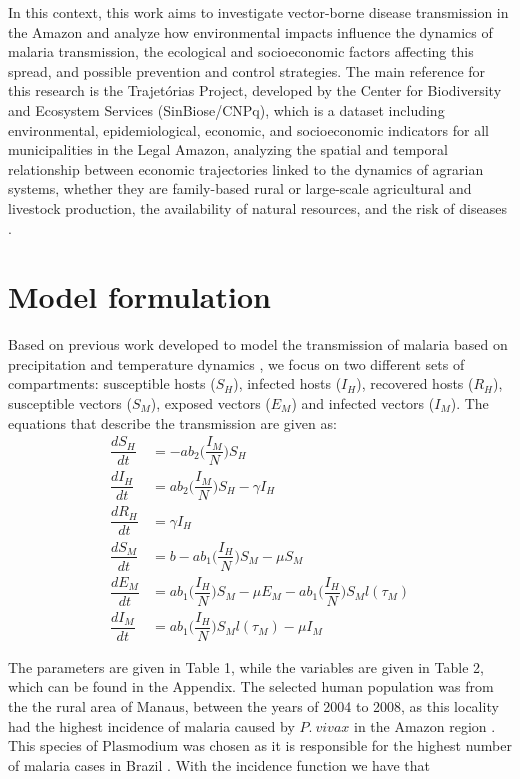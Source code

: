 \documentclass[3p,times]{elsarticle}
\begin{document}
In this context, this work aims to investigate vector-borne disease 
transmission in the Amazon and analyze how environmental impacts 
influence the dynamics of malaria transmission, the ecological and 
socioeconomic factors affecting this spread, and possible prevention 
and control strategies. The main reference for this research is the 
Trajetórias Project, developed by the Center for Biodiversity and 
Ecosystem Services (SinBiose/CNPq), which is a dataset including 
environmental, epidemiological, economic, and socioeconomic indicators 
for all municipalities in the Legal Amazon, analyzing the spatial and 
temporal relationship between economic trajectories linked to the dynamics 
of agrarian systems, whether they are family-based rural or large-scale 
agricultural and livestock production, the availability of natural resources, 
and the risk of diseases \cite{Rorato2023}.

\section{Model formulation}
\label{}
Based on previous work developed to model the transmission of malaria based on precipitation and temperature dynamics \cite{Parham2010}, we focus on two different sets of compartments: susceptible hosts ($S_H$), infected hosts ($I_H$), recovered hosts ($R_H$), susceptible vectors ($S_M$), exposed vectors ($E_M$) and infected vectors ($I_M$). The equations that describe the transmission are given as:
\begin{align}
\dfrac{dS_H}{dt} & = -ab_2\bigg(\dfrac{I_M}{N}\bigg)S_H \label{eq1}\\
\dfrac{dI_H}{dt} & = ab_2\bigg(\dfrac{I_M}{N}\bigg)S_H - \gamma I_H \label{eq2}\\
\dfrac{dR_H}{dt} & = \gamma I_H \label{eq3}\\
\dfrac{dS_M}{dt} & = b - ab_1\bigg(\dfrac{I_H}{N}\bigg)S_M - \mu S_M \label{eq4}\\
\dfrac{dE_M}{dt} & = ab_1\bigg(\dfrac{I_H}{N}\bigg)S_M - \mu E_M - ab_1\bigg(\dfrac{I_H}{N}\bigg)S_Ml(\tau_M) \label{eq5}\\
\dfrac{dI_M}{dt} & = ab_1\bigg(\dfrac{I_H}{N}\bigg)S_Ml(\tau_M) - \mu I_M \label{eq6}
\end{align}

The parameters are given in Table 1, while the variables are given in Table 2, which can be found in the Appendix. The selected human population was from the the rural area of Manaus, between the years of 2004 to 2008, as this locality had the highest incidence of malaria caused by $P. \ vivax$ in the Amazon region \cite{Rorato2023}. This species of $\text{Plasmodium}$ was chosen as it is responsible for the highest number of malaria cases in Brazil \cite{OliveiraFerreira2010, 10.3389/fpubh.2021.647754}. With the incidence function \cite{Rorato2023} we have that
\end{document}
